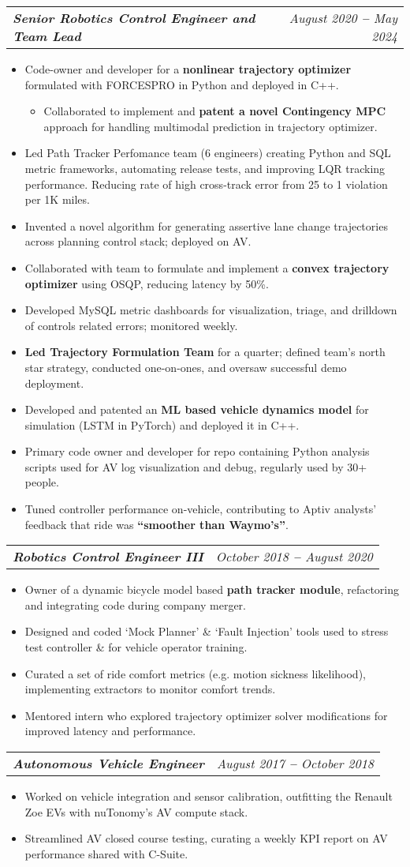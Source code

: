 \documentclass[letterpaper,11pt]{article}
\makeatletter
\newcommand{\resumeItem}[1]{
  \item\small{
    {#1}\vspace{-2pt}
  }
}
\newcommand{\resumeSubSubheading}[2]{
    \vspace{-2pt}\item
    \begin{tabular*}{1.0\textwidth}{l@{\extracolsep{\fill}}r}
      \textit{\textbf{\small#1}} & \textit{\small #2} \\
    \end{tabular*}\vspace{-7pt}
}
\newcommand{\resumeItemListStart}{\begin{itemize}[leftmargin=15pt]}
\newcommand{\resumeItemListEnd}{\end{itemize}\vspace{-5pt}}
\makeatother
\begin{document}
\resumeSubSubheading
{Senior Robotics Control Engineer and Team Lead}{August 2020 \textbf{--} May 2024}
\resumeItemListStart
\resumeItem{Code-owner and developer for a \textbf{nonlinear trajectory optimizer} formulated with FORCESPRO in Python and deployed in C++.}
\resumeItemListStart
\resumeItem{Collaborated to implement and \textbf{patent a novel Contingency MPC} approach for handling multimodal prediction in trajectory optimizer.}
\resumeItemListEnd
\resumeItem{Led Path Tracker Perfomance team (6 engineers) creating Python and SQL metric frameworks, automating release tests, and improving LQR tracking performance. Reducing rate of high cross-track error from 25 to 1 violation per 1K miles.}
\resumeItem{Invented a novel algorithm for generating assertive lane change trajectories across planning control stack; deployed on AV.}
\resumeItem{Collaborated with team to formulate and implement a \textbf{convex trajectory optimizer} using OSQP, reducing latency by 50\%.}
\resumeItem{Developed MySQL metric dashboards for visualization, triage, and drilldown of controls related errors; monitored weekly.}
\resumeItem{\textbf{Led Trajectory Formulation Team} for a quarter; defined team’s north star strategy, conducted one-on-ones, and oversaw successful demo deployment.}
\resumeItem{Developed and patented an \textbf{ML based vehicle dynamics model} for simulation (LSTM in PyTorch) and deployed it in C++.}
\resumeItem{Primary code owner and developer for repo containing Python analysis scripts used for AV log visualization and debug, regularly used by 30+ people.}
\resumeItem{Tuned controller performance on-vehicle, contributing to Aptiv analysts’ feedback that ride was \textbf{“smoother than Waymo’s”}.}
\resumeItemListEnd

\resumeSubSubheading
{Robotics Control Engineer III}{October 2018 \textbf{--} August 2020}
\resumeItemListStart
\resumeItem{Owner of a dynamic bicycle model based \textbf{path tracker module}, refactoring and integrating code during company merger.}
\resumeItem{Designed and coded ‘Mock Planner’ \& ‘Fault Injection’ tools used to stress test controller \& for vehicle operator training.}
\resumeItem{Curated a set of ride comfort metrics (e.g. motion sickness likelihood), implementing extractors to monitor comfort trends.}
\resumeItem{Mentored intern who explored trajectory optimizer solver modifications for improved latency and performance.}
\resumeItemListEnd

\resumeSubSubheading
{Autonomous Vehicle Engineer}{August 2017 \textbf{--} October 2018}
\resumeItemListStart
\resumeItem{Worked on vehicle integration and sensor calibration, outfitting the Renault Zoe EVs with nuTonomy’s AV compute stack.}
\resumeItem{Streamlined AV closed course testing, curating a weekly KPI report on AV performance shared with C-Suite.}
\resumeItemListEnd
\end{document}
